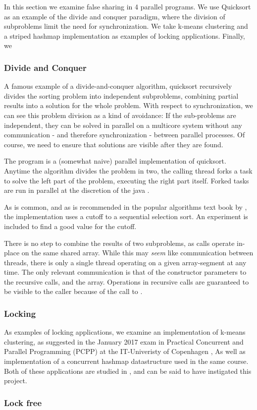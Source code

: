 In this section we examine false sharing in 4  parallel programs. We use Quicksort as an example of the divide and
conquer paradigm, where the division of subproblems limit the need for
synchronization. We take k-means clustering and a striped hashmap implementation
as examples of locking applications. Finally, we 

\subsubsection{Divide and Conquer }
A famous example of a divide-and-conquer algorithm, quicksort recursively
divides the sorting problem into independent subproblems, combining partial
results into a solution for the whole problem. With respect to synchronization,
we can see this problem division as a kind of avoidance: If the sub-problems are
independent, they can be solved in parallel on a multicore system without any
communication - and therefore synchronization - between parallel processes.
Of course, we need to ensure that solutions are visible after they are
found.


The program is a (somewhat naive) parallel implementation of quicksort. Anytime
the algorithm divides the problem in two, the calling thread forks a task to
solve the left part of the problem, executing the right part itself. Forked
tasks are run in parallel at the discretion of the java .

As is common, and as is recommended in the popular algorithms text book by
\citet{sedgewick}, the implementation uses a cutoff to a sequential selection
sort. An experiment is included to find a good value for the cutoff.

There is no step to combine the results of two subproblems, as calls operate
in-place on the same shared array. While this may \textit{seem} like communication
between threads, there is only a single thread operating on a given
array-segment at any time. The only relevant communication is that of the
constructor parameters to the recursive calls, and the array. Operations in
recursive calls are guaranteed to be visible to the caller because of the
call to .


\subsubsection{Locking }
As examples of locking applications, we examine an implementation of k-means
clustering, as suggested in the January 2017 exam in Practical Concurrent and
Parallel Programming (PCPP) at the IT-Univeristy of Copenhagen \cite{kmeansexam,
kmeansexamcode}, As well as implementation of a concurrent hashmap datastructure
used in the same course. Both of these applications are studied in
\cite{mystery}, and can be said to have instigated this project.


\subsubsection{Lock free}
